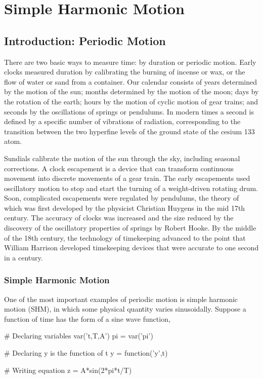 \chapter{Simple Harmonic Motion}

\section{Introduction: Periodic Motion}

There are two basic ways to measure time: by duration or periodic motion. Early 
clocks measured duration by calibrating the burning of incense or wax, or the 
flow of water or sand from a container. Our calendar consists of years 
determined by the motion of the sun; months determined by the motion of the 
moon; days by the rotation of the earth; hours by the motion of cyclic motion 
of gear trains; and seconds by the oscillations of springs or pendulums. In 
modern times a second is defined by a specific number of vibrations of 
radiation, corresponding to the transition between the two hyperfine levels of 
the ground state of the cesium 133 atom.


Sundials calibrate the motion of the sun through the sky, including seasonal
corrections. A clock escapement is a device that can transform continuous 
movement into discrete movements of a gear train. The early escapements used 
oscillatory motion to stop and start the turning of a weight-driven rotating 
drum. Soon, complicated escapements were regulated by pendulums, the theory of 
which was first developed by the physicist Christian Huygens in the mid 17th 
century. The accuracy of clocks was increased and the size reduced by the 
discovery of the oscillatory properties of springs by Robert Hooke. By the 
middle of the 18th century, the technology of timekeeping advanced to the point 
that William Harrison developed timekeeping devices that were accurate to one 
second in a century. 

\subsection{Simple Harmonic Motion}
One of the most important examples of periodic motion is simple harmonic motion 
(SHM), in which some physical quantity varies sinusoidally. Suppose a function 
of time has the form of a sine wave function,

\begin{sagesilent}
# Declaring variables
var('t,T,A')
pi = var('pi')

# Declaring y is the function of t
y = function('y',t)

# Writing equation
z = A*sin(2*pi*t/T)
\end{sagesilent}

